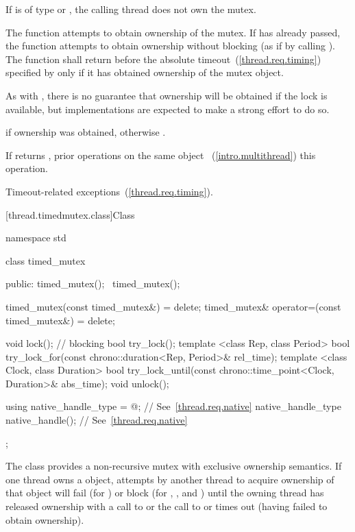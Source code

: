 \begin{itemdescr}
\pnum
\requires If  is of type  or
, the calling thread does not own the
mutex.

\pnum
\effects The function attempts to obtain ownership of the mutex. If
 has already passed, the function attempts to obtain ownership
without blocking (as if by calling ). The function shall
return before the absolute timeout~(\ref{thread.req.timing}) specified by
 only if it has obtained ownership of the mutex object.
\begin{note} As with , there is no guarantee that ownership will
be obtained if the lock is available, but implementations are expected to make a
strong effort to do so. \end{note}

\pnum\returntype {}

\pnum
\returns {} if ownership was obtained, otherwise .

\pnum
\sync If  returns , prior 
operations on the same object ~(\ref{intro.multithread})
this operation.

\pnum\throws Timeout-related exceptions~(\ref{thread.req.timing}).
\end{itemdescr}

[thread.timedmutex.class]{Class }

\begin{codeblock}
namespace std {
  class timed_mutex {
  public:
    timed_mutex();
    ~timed_mutex();

    timed_mutex(const timed_mutex&) = delete;
    timed_mutex& operator=(const timed_mutex&) = delete;

    void lock();  // blocking
    bool try_lock();
    template <class Rep, class Period>
      bool try_lock_for(const chrono::duration<Rep, Period>& rel_time);
    template <class Clock, class Duration>
      bool try_lock_until(const chrono::time_point<Clock, Duration>& abs_time);
    void unlock();

    using native_handle_type = @\impdef@; // See~\ref{thread.req.native}
    native_handle_type native_handle();                // See~\ref{thread.req.native}
  };
}
\end{codeblock}

\pnum
The class  provides a non-recursive mutex with exclusive ownership
semantics. If one thread owns a  object, attempts by another thread
to acquire ownership of that object will fail (for ) or block
(for , , and ) until
the owning thread has released ownership with a call to  or the
call to  or  times out (having
failed to obtain ownership).

